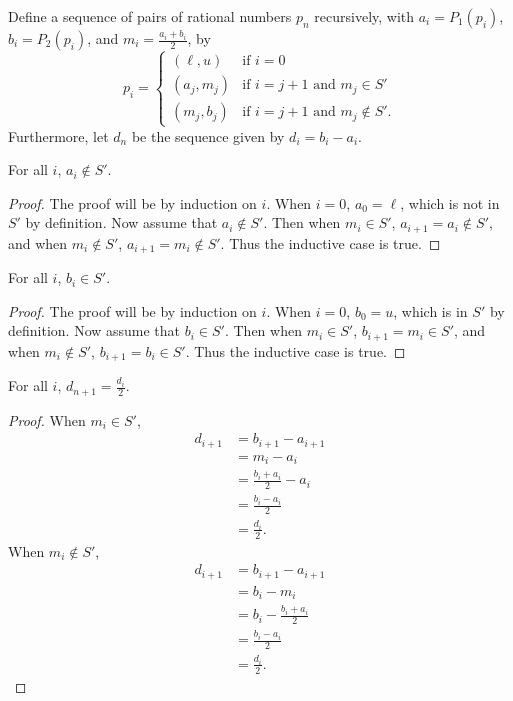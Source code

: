 \documentclass[../../math.tex]{subfiles}
\begin{document}
\begin{definition}
    Define a sequence of pairs of rational numbers $p_n$ recursively, with $a_i
    = P_1(p_i)$, $b_i = P_2(p_i)$, and $m_i = \frac{a_i + b_i}{2}$, by
    \[
        p_i =
        \begin{cases}
            (\ell, u) & \text{if $i = 0$} \\
            (a_j, m_j) & \text{if $i = j + 1$ and $m_j \in S'$} \\
            (m_j, b_j) & \text{if $i = j + 1$ and $m_j \notin S'$.}
        \end{cases}
    \]
    Furthermore, let $d_n$ be the sequence given by $d_i = b_i - a_i$.
\end{definition}

\begin{lemma} \label{real_sup_a_lower}
    For all $i$, $a_i \notin S'$.
\end{lemma}
\begin{proof}
    The proof will be by induction on $i$.  When $i = 0$, $a_0 = \ell$, which is
    not in $S'$ by definition.  Now assume that $a_i \notin S'$.  Then when $m_i
    \in S'$, $a_{i + 1} = a_i \notin S'$, and when $m_i \notin S'$, $a_{i + 1} =
    m_i \notin S'$.  Thus the inductive case is true.
\end{proof}

\begin{lemma} \label{real_sup_b_upper}
    For all $i$, $b_i \in S'$.
\end{lemma}
\begin{proof}
    The proof will be by induction on $i$.  When $i = 0$, $b_0 = u$, which is in
    $S'$ by definition.  Now assume that $b_i \in S'$.  Then when $m_i \in S'$,
    $b_{i + 1} = m_i \in S'$, and when $m_i \notin S'$, $b_{i + 1} = b_i \in
    S'$.  Thus the inductive case is true.
\end{proof}

\begin{lemma} \label{real_sup_d_suc}
    For all $i$, $d_{n+1} = \frac{d_i}{2}$.
\end{lemma}
\begin{proof}
    When $m_i \in S'$,
    \begin{align*}
        d_{i + 1}
        &= b_{i + 1} - a_{i + 1} \\
        &= m_i - a_i \\
        &= \frac{b_i + a_i}{2} - a_i \\
        &= \frac{b_i - a_i}{2} \\
        &= \frac{d_i}{2}.
    \end{align*}
    When $m_i \notin S'$,
    \begin{align*}
        d_{i + 1}
        &= b_{i + 1} - a_{i + 1} \\
        &= b_i - m_i \\
        &= b_i - \frac{b_i + a_i}{2} \\
        &= \frac{b_i - a_i}{2} \\
        &= \frac{d_i}{2}.
    \end{align*}
\end{proof}
\end{document}
